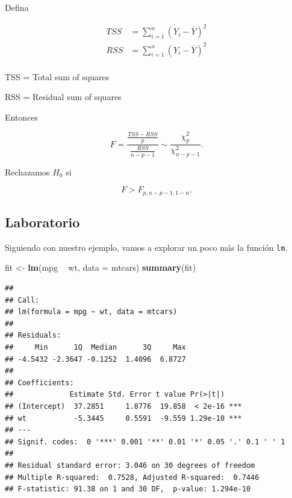 \documentclass[
  12pt,
]{book}
\newenvironment{Shaded}{\begin{snugshade}}{\end{snugshade}}
\newcommand{\DataTypeTok}[1]{\textcolor[rgb]{0.13,0.29,0.53}{#1}}
\newcommand{\KeywordTok}[1]{\textcolor[rgb]{0.13,0.29,0.53}{\textbf{#1}}}
\newcommand{\NormalTok}[1]{#1}
\newcommand{\OperatorTok}[1]{\textcolor[rgb]{0.81,0.36,0.00}{\textbf{#1}}}
\newcommand{\StringTok}[1]{\textcolor[rgb]{0.31,0.60,0.02}{#1}}
\theoremstyle{definition}
\theoremstyle{definition}
\theoremstyle{definition}
\theoremstyle{remark}
\begin{document}
Defina

\begin{align*}
 TSS &= \sum_{i=1}^{n} \left( Y_{i} -\overline{Y} \right)^{2} \\
 RSS &= \sum_{i=1}^{n} \left( Y_{i} -\overline{Y} \right)^{2} \\
 \end{align*}

TSS = Total sum of squares

RSS = Residual sum of squares

Entonces

\begin{equation*}
 F = \frac{\frac{TSS-RSS}{p}}{\frac{RSS}{n-p-1}} \sim \frac{\chi^{2}_{p}}{\chi^{2}_{n-p-1}}.
 \end{equation*}

Rechazamos \(H_{0}\) si

\begin{equation*}
 F > F_{p, n-p-1, 1-\alpha}.
 \end{equation*}

\hypertarget{laboratorio-2}{%
\subsection{Laboratorio}\label{laboratorio-2}}

Siguiendo con nuestro ejemplo, vamos a explorar un poco más la función \texttt{lm}.

\begin{Shaded}
\begin{Highlighting}[]
\NormalTok{fit <-}\StringTok{ }\KeywordTok{lm}\NormalTok{(mpg }\OperatorTok{~}\StringTok{ }\NormalTok{wt, }\DataTypeTok{data =}\NormalTok{ mtcars)}
\KeywordTok{summary}\NormalTok{(fit)}
\end{Highlighting}
\end{Shaded}

\begin{verbatim}
## 
## Call:
## lm(formula = mpg ~ wt, data = mtcars)
## 
## Residuals:
##     Min      1Q  Median      3Q     Max 
## -4.5432 -2.3647 -0.1252  1.4096  6.8727 
## 
## Coefficients:
##             Estimate Std. Error t value Pr(>|t|)    
## (Intercept)  37.2851     1.8776  19.858  < 2e-16 ***
## wt           -5.3445     0.5591  -9.559 1.29e-10 ***
## ---
## Signif. codes:  0 '***' 0.001 '**' 0.01 '*' 0.05 '.' 0.1 ' ' 1
## 
## Residual standard error: 3.046 on 30 degrees of freedom
## Multiple R-squared:  0.7528, Adjusted R-squared:  0.7446 
## F-statistic: 91.38 on 1 and 30 DF,  p-value: 1.294e-10
\end{verbatim}
\end{document}

